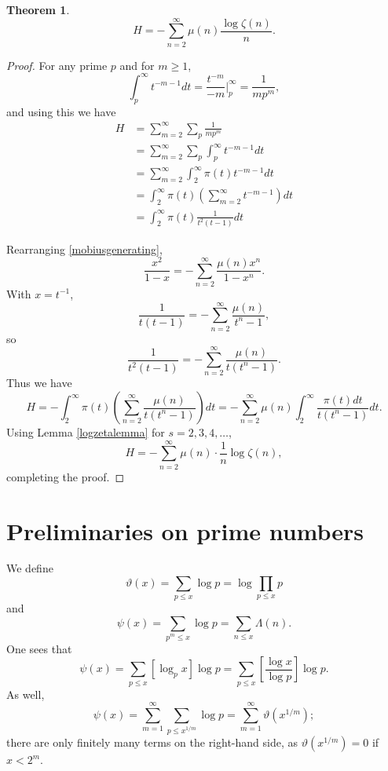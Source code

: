 \documentclass{article}
\newtheorem{theorem}{Theorem}
\begin{document}
\begin{theorem}
\[
H=-\sum_{n=2}^\infty \mu(n) \frac{\log \zeta(n)}{n}.
\]
\end{theorem}
\begin{proof}
For any prime $p$ and for $m \geq 1$,
\[
\int_p^\infty t^{-m-1} dt  = 
\frac{t^{-m}}{-m} \bigg|_p^\infty =
\frac{1}{mp^m}, 
\]
and using this we have
\begin{align*}
H&=\sum_{m=2}^\infty \sum_p \frac{1}{mp^m}\\
&=\sum_{m=2}^\infty \sum_p \int_p^\infty t^{-m-1} dt \\
&=\sum_{m=2}^\infty \int_2^\infty \pi(t) t^{-m-1} dt  \\
&=\int_2^\infty \pi(t) \left( \sum_{m=2}^\infty t^{-m-1}\right) dt\\
&=\int_2^\infty \pi(t) \frac{1}{t^2(t-1)}  dt
\end{align*}

Rearranging \eqref{mobiusgenerating}, 
\[
\frac{x^2}{1-x}=
-\sum_{n=2}^\infty  \frac{\mu(n) x^n}{1-x^n}.
\]
With $x=t^{-1}$,
\[
\frac{1}{t(t-1)} = -\sum_{n=2}^\infty \frac{\mu(n)}{t^n-1},
\]
so
\[
\frac{1}{t^2(t-1)} = -\sum_{n=2}^\infty \frac{\mu(n)}{t(t^n-1)}.
\]
Thus we have
\[
H=-\int_2^\infty \pi(t) \left( \sum_{n=2}^\infty \frac{\mu(n)}{t(t^n-1)}\right) dt
=-\sum_{n=2}^\infty \mu(n) \int_2^\infty \frac{\pi(t) dt}{t(t^n-1)} dt.
\]
Using  Lemma \ref{logzetalemma} for $s=2,3,4,\ldots$,
\[
H=-\sum_{n=2}^\infty \mu(n) \cdot \frac{1}{n} \log \zeta(n),
\]
completing the proof.
\end{proof}




\section{Preliminaries on prime numbers}
We define
\[
\vartheta(x) = \sum_{p \leq x} \log p = \log \prod_{p \leq x} p
\]
and
\[
\psi(x) = \sum_{p^m \leq x} \log p = \sum_{n \leq x} \Lambda(n).
\]
One sees that
\[
\psi(x) = \sum_{p \leq x} [\log_p x] \log p = 
\sum_{p \leq x} \left[ \frac{\log x}{\log p}\right] \log p.
\]
As well,
\begin{equation}
\psi(x)
= 
\sum_{m=1}^\infty \sum_{p \leq x^{1/m}} \log p
=
\sum_{m=1}^\infty \vartheta(x^{1/m});
\label{thetasum}
\end{equation}
there are only finitely many terms on the right-hand side, as $\vartheta(x^{1/m})=0$ if
$x<2^m$.
\end{document}
